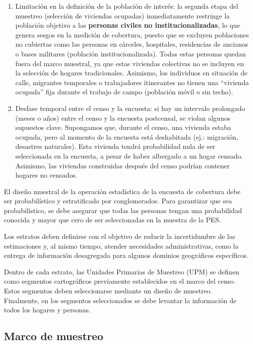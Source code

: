 \documentclass[
  12pt,
]{book}
\begin{document}
\begin{enumerate}
\def\labelenumi{\arabic{enumi}.}
\item
  Limitación en la definición de la población de interés: la segunda etapa del muestreo (selección de viviendas ocupadas) inmediatamente restringe la población objetivo a las \textbf{personas civiles no institucionalizadas}, lo que genera sesgos en la medición de cobertura, puesto que se excluyen poblaciones no cubiertas como las personas en cárceles, hospitales, residencias de ancianos o bases militares (población institucionalizada). Todas estas personas quedan fuera del marco muestral, ya que estas viviendas colectivas no se incluyen en la selección de hogares tradicionales. Asimismo, los individuos en situación de calle, migrantes temporales o trabajadores itinerantes no tienen una ``vivienda ocupada'' fija durante el trabajo de campo (población móvil o sin techo).
\item
  Desfase temporal entre el censo y la encuesta: si hay un intervalo prolongado (meses o años) entre el censo y la encuesta postcensal, se violan algunos supuestos clave. Supongamos que, durante el censo, una vivienda estaba ocupada, pero al momento de la encuesta está deshabitada (ej.: migración, desastres naturales). Esta vivienda tendrá probabilidad nula de ser seleccionada en la encuesta, a pesar de haber albergado a un hogar censado. Asimismo, las viviendas construidas después del censo podrían contener hogares no censados.
\end{enumerate}

El diseño muestral de la operación estadística de la encuesta de cobertura debe ser probabilístico y estratificado por conglomerados. Para garantizar que sea probabilístico, se debe asegurar que todas las personas tengan una probabilidad conocida y mayor que cero de ser seleccionadas en la muestra de la PES.

Los estratos deben definirse con el objetivo de reducir la incertidumbre de las estimaciones y, al mismo tiempo, atender necesidades administrativas, como la entrega de información desagregada para algunos dominios geográficos específicos.

Dentro de cada estrato, las Unidades Primarias de Muestreo (UPM) se definen como segmentos cartográficos previamente establecidos en el marco del censo. Estos segmentos deben seleccionarse mediante un diseño de muestreo. Finalmente, en los segmentos seleccionados se debe levantar la información de todos los hogares y personas.

\subsection{Marco de muestreo}\label{marco-de-muestreo}
\end{document}
